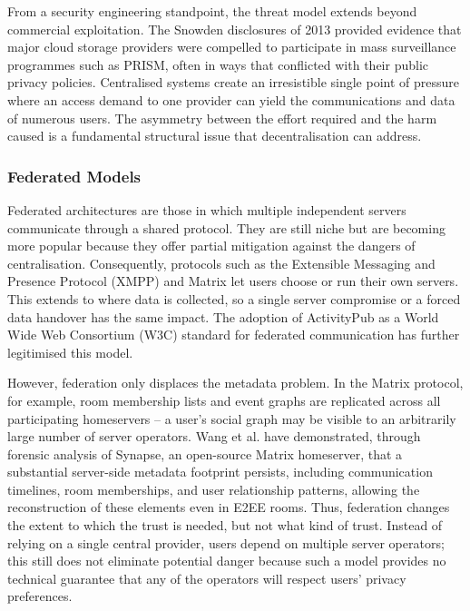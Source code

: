 \documentclass[12pt,a4paper]{article}
\begin{document}
From a security engineering standpoint, the threat model extends beyond commercial exploitation. The Snowden disclosures of 2013 \cite{snowden2013} provided evidence that major cloud storage providers were compelled to participate in mass surveillance programmes such as PRISM, often in ways that conflicted with their public privacy policies. Centralised systems create an irresistible single point of pressure where an access demand to one provider can yield the communications and data of numerous users. The asymmetry between the effort required and the harm caused is a fundamental structural issue that decentralisation can address.

\subsubsection{Federated Models}

Federated architectures are those in which multiple independent servers communicate through a shared protocol. They are still niche but are becoming more popular because they offer partial mitigation against the dangers of centralisation. Consequently, protocols such as the Extensible Messaging and Presence Protocol (XMPP) \cite{rfc6120} and Matrix \cite{matrix} let users choose or run their own servers. This extends to where data is collected, so a single server compromise or a forced data handover has the same impact. The adoption of ActivityPub \cite{activitypub} as a World Wide Web Consortium (W3C) standard for federated communication has further legitimised this model.

However, federation only displaces the metadata problem. In the Matrix protocol, for example, room membership lists and event graphs are replicated across all participating homeservers – a user’s social graph may be visible to an arbitrarily large number of server operators. Wang et al. \cite{wang2026} have demonstrated, through forensic analysis of Synapse, an open-source Matrix homeserver, that a substantial server-side metadata footprint persists, including communication timelines, room memberships, and user relationship patterns, allowing the reconstruction of these elements even in E2EE rooms. Thus, federation changes the extent to which the trust is needed, but not what kind of trust. Instead of relying on a single central provider, users depend on multiple server operators; this still does not eliminate potential danger because such a model provides no technical guarantee that any of the operators will respect users’ privacy preferences.
\end{document}
